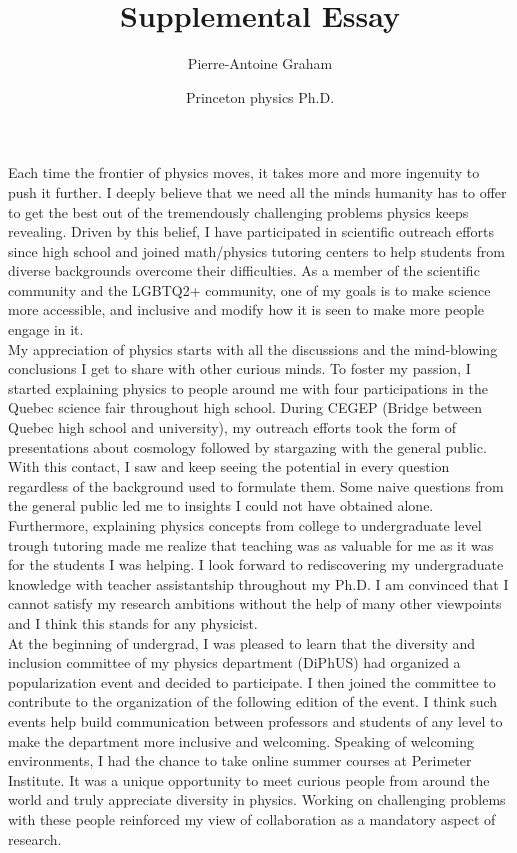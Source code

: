 \documentclass[12pt]{article}
\title{Supplemental Essay}
\author{Pierre-Antoine Graham}
\date{Princeton physics Ph.D.}
\begin{document}
\maketitle
\vspace{0.5cm}

Each time the frontier of physics moves, it takes more and more ingenuity to push it further. I deeply believe that we need all the minds humanity has to offer to get the best out of the tremendously challenging problems physics keeps revealing. Driven by this belief, I have participated in scientific outreach efforts since high school and joined math/physics tutoring centers to help students from diverse backgrounds overcome their difficulties. As a member of the scientific community and the LGBTQ2+ community, one of my goals is to make science more accessible, and inclusive and modify how it is seen to make more people engage in it. \\

My appreciation of physics starts with all the discussions and the mind-blowing conclusions I get to share with other curious minds. To foster my passion, I started explaining physics to people around me with four participations in the Quebec science fair throughout high school. During CEGEP (Bridge between Quebec high school and university), my outreach efforts took the form of presentations about cosmology followed by stargazing with the general public. With this contact, I saw and keep seeing the potential in every question regardless of the background used to formulate them. Some naive questions from the general public led me to insights I could not have obtained alone. Furthermore, explaining physics concepts from college to undergraduate level trough tutoring made me realize that teaching was as valuable for me as it was for the students I was helping. I look forward to rediscovering my undergraduate knowledge with teacher assistantship throughout my Ph.D. I am convinced that I cannot satisfy my research ambitions without the help of many other viewpoints and I think this stands for any physicist.  \\

At the beginning of undergrad, I was pleased to learn that the diversity and inclusion committee of my physics department (DiPhUS) had organized a popularization event and decided to participate. I then joined the committee to contribute to the organization of the following edition of the event. I think such events help build communication between professors and students of any level to make the department more inclusive and welcoming. Speaking of welcoming environments, I had the chance to take online summer courses at Perimeter Institute. It was a unique opportunity to meet curious people from around the world and truly appreciate diversity in physics. Working on challenging problems with these people reinforced my view of collaboration as a mandatory aspect of research. \\
\end{document}
